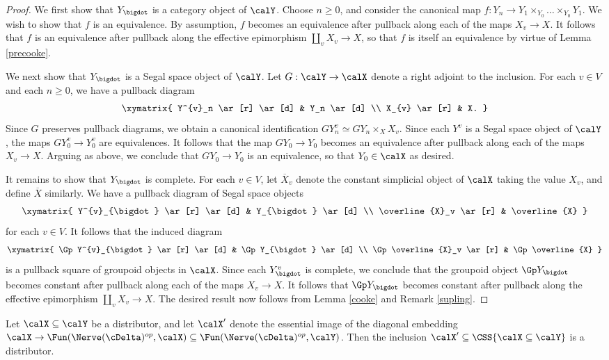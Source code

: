 \begin{proof}
We first show that $Y_{\bigdot}$ is a category object of $\calY$. Choose $n \geq 0$, and consider the canonical map $f: Y_n \rightarrow Y_1 \times_{Y_0} \ldots \times_{Y_0} Y_1$. We wish to show that
$f$ is an equivalence. By assumption, $f$ becomes an equivalence after pullback along each
of the maps $X_{v} \rightarrow X$. It follows that $f$ is an equivalence after pullback along the
effective epimorphism $\coprod_{v} X_v \rightarrow X$, so that $f$ is itself an equivalence by virtue of Lemma \ref{precooke}.

We next show that $Y_{\bigdot}$ is a Segal space object of $\calY$. Let $G: \calY \rightarrow \calX$
denote a right adjoint to the inclusion. For each $v \in V$ and each $n \geq 0$, we have a pullback diagram
$$ \xymatrix{ Y^{v}_n \ar[r] \ar[d] & Y_n \ar[d] \\
X_{v} \ar[r] & X. }$$
Since $G$ preserves pullback diagrams, we obtain a canonical identification
$GY^{v}_n \simeq GY_n \times_{ X} X_v$. Since each $Y^v$ is a Segal space object of
$\calY$, the maps $GY^v_0 \rightarrow Y^v_0$ are equivalences. It follows that the map
$GY_0 \rightarrow Y_0$ becomes an equivalence after pullback along each of the maps
$X_v \rightarrow X$. Arguing as above, we conclude that $GY_0 \rightarrow Y_0$ is an equivalence,
so that $Y_0 \in \calX$ as desired.

It remains to show that $Y_{\bigdot}$ is complete. For each $v \in V$, let $\overline{X}_v$ denote
the constant simplicial object of $\calX$ taking the value $X_v$, and define $\overline{X}$ similarly.
We have a pullback diagram of Segal space objects
$$ \xymatrix{ Y^{v}_{\bigdot} \ar[r] \ar[d] & Y_{\bigdot} \ar[d] \\
\overline{X}_v \ar[r] & \overline{X} }$$
for each $v \in V$. It follows that the induced diagram
$$ \xymatrix{ \Gp Y^{v}_{\bigdot} \ar[r] \ar[d] & \Gp Y_{\bigdot} \ar[d] \\
\Gp \overline{X}_v \ar[r] & \Gp \overline{X} }$$
is a pullback square of groupoid objects in $\calX$. Since each $Y^{v}_{\bigdot}$ is complete, we conclude that the groupoid object $\Gp Y_{\bigdot}$ becomes constant after pullback along each of the maps $X_v \rightarrow X$. It follows that $\Gp Y_{\bigdot}$ becomes constant after pullback along the effective epimorphism $\coprod_{v} X_v \rightarrow X$. The desired result now follows from Lemma \ref{cooke} and Remark \ref{supling}.
\end{proof}

\begin{proposition}\label{ittaboy}
Let $\calX \subseteq \calY$ be a distributor, and let $\calX'$ denote the essential image of the diagonal embedding $\calX \rightarrow \Fun( \Nerve(\cDelta)^{op}, \calX) \subseteq \Fun( \Nerve(\cDelta)^{op}, \calY)$. Then the inclusion $\calX' \subseteq \CSS{ \calX \subseteq \calY }$ is a distributor.
\end{proposition}

